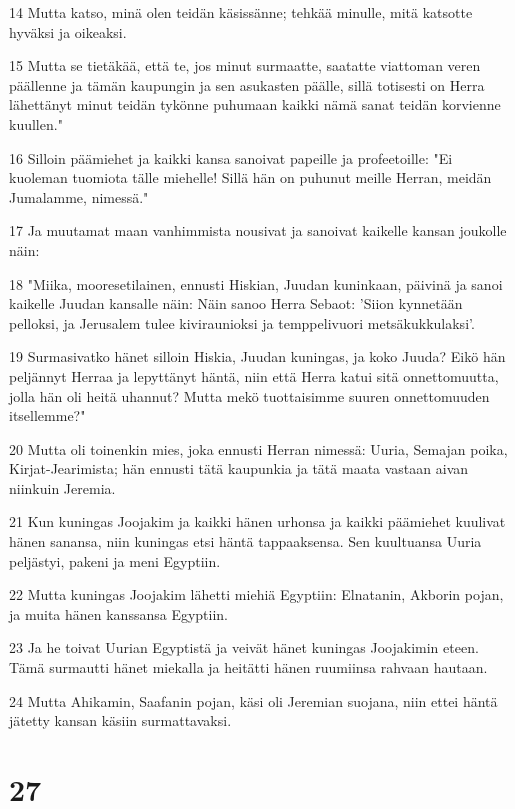 \par 14 Mutta katso, minä olen teidän käsissänne; tehkää minulle, mitä katsotte hyväksi ja oikeaksi.
\par 15 Mutta se tietäkää, että te, jos minut surmaatte, saatatte viattoman veren päällenne ja tämän kaupungin ja sen asukasten päälle, sillä totisesti on Herra lähettänyt minut teidän tykönne puhumaan kaikki nämä sanat teidän korvienne kuullen."
\par 16 Silloin päämiehet ja kaikki kansa sanoivat papeille ja profeetoille: "Ei kuoleman tuomiota tälle miehelle! Sillä hän on puhunut meille Herran, meidän Jumalamme, nimessä."
\par 17 Ja muutamat maan vanhimmista nousivat ja sanoivat kaikelle kansan joukolle näin:
\par 18 "Miika, mooresetilainen, ennusti Hiskian, Juudan kuninkaan, päivinä ja sanoi kaikelle Juudan kansalle näin: Näin sanoo Herra Sebaot: 'Siion kynnetään pelloksi, ja Jerusalem tulee kiviraunioksi ja temppelivuori metsäkukkulaksi'.
\par 19 Surmasivatko hänet silloin Hiskia, Juudan kuningas, ja koko Juuda? Eikö hän peljännyt Herraa ja lepyttänyt häntä, niin että Herra katui sitä onnettomuutta, jolla hän oli heitä uhannut? Mutta mekö tuottaisimme suuren onnettomuuden itsellemme?"
\par 20 Mutta oli toinenkin mies, joka ennusti Herran nimessä: Uuria, Semajan poika, Kirjat-Jearimista; hän ennusti tätä kaupunkia ja tätä maata vastaan aivan niinkuin Jeremia.
\par 21 Kun kuningas Joojakim ja kaikki hänen urhonsa ja kaikki päämiehet kuulivat hänen sanansa, niin kuningas etsi häntä tappaaksensa. Sen kuultuansa Uuria peljästyi, pakeni ja meni Egyptiin.
\par 22 Mutta kuningas Joojakim lähetti miehiä Egyptiin: Elnatanin, Akborin pojan, ja muita hänen kanssansa Egyptiin.
\par 23 Ja he toivat Uurian Egyptistä ja veivät hänet kuningas Joojakimin eteen. Tämä surmautti hänet miekalla ja heitätti hänen ruumiinsa rahvaan hautaan.
\par 24 Mutta Ahikamin, Saafanin pojan, käsi oli Jeremian suojana, niin ettei häntä jätetty kansan käsiin surmattavaksi.

\chapter{27}

